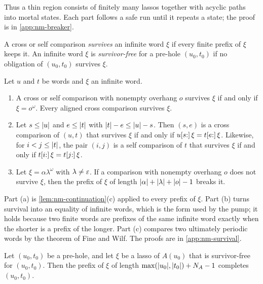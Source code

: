 Thus a thin region consists of finitely many lassos together with acyclic
paths into mortal states. Each part follows a safe run until it repeats a
state; the proof is in \cref{app:nm-breaker}.

\begin{definition}[Survival]\label{def:nm-survival}
A cross or self comparison \emph{survives} an infinite word $\xi$ if every
finite prefix of $\xi$ keeps it. An infinite word $\xi$ is
\emph{survivor-free} for a pre-hole $(u_0,t_0)$ if no obligation of
$(u_0,t_0)$ survives $\xi$.
\end{definition}

\begin{lemma}[Survival]\label{lem:nm-survival}
Let $u$ and $t$ be words and $\xi$ an infinite word.
\begin{enumerate}[label=(\alph*)]
\item A cross or self comparison with nonempty overhang $o$ survives $\xi$ if
and only if $\xi=o^\omega$. Every aligned cross comparison survives $\xi$.
\item Let $s\le\lvert u\rvert$ and $e\le\lvert t\rvert$ with $\lvert t\rvert-e\le\lvert u\rvert-s$. Then
$(s,e)$ is a cross comparison of $(u,t)$ that survives $\xi$ if and only if
$u[s{:}]\,\xi=t[e{:}]\,\xi$. Likewise, for $i<j\le\lvert t\rvert$, the pair $(i,j)$
is a self comparison of $t$ that survives $\xi$ if and only if
$t[i{:}]\,\xi=t[j{:}]\,\xi$.
\item Let $\xi=\alpha\lambda^\omega$ with $\lambda\ne\varepsilon$. If a comparison
with nonempty overhang $o$ does not survive $\xi$, then the prefix of $\xi$ of
length $\lvert \alpha\rvert+\lvert \lambda\rvert+\lvert o\rvert-1$ breaks it.
\end{enumerate}
\end{lemma}

Part (a) is \cref{lem:nm-continuation}(c) applied to every prefix of $\xi$.
Part (b) turns survival into an equality of infinite words, which is the form
used by the pump; it holds because two finite words are prefixes of the same
infinite word exactly when the shorter is a prefix of the longer. Part (c)
compares two ultimately periodic words by the theorem of Fine and Wilf. The
proofs are in \cref{app:nm-survival}.

\begin{corollary}\label{cor:nm-lasso-completion}
Let $(u_0,t_0)$ be a pre-hole, and let $\xi$ be a lasso of $A(u_0)$ that is
survivor-free for $(u_0,t_0)$. Then the prefix of $\xi$ of length
$\max(\lvert u_0\rvert,\lvert t_0\rvert)+N_A-1$ completes $(u_0,t_0)$.
\end{corollary}

